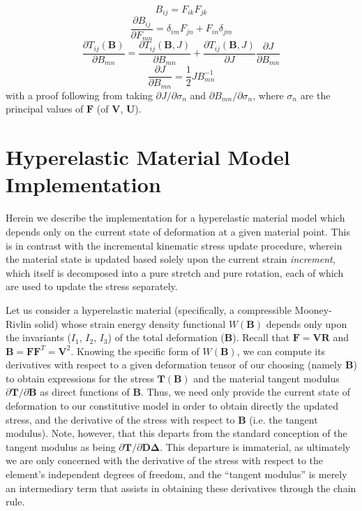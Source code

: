 \documentclass[11pt]{article} %
\begin{document}
\begin{equation}
	B_{ij} = F_{ik} F_{jk}
\end{equation}
\begin{equation}
	\frac{\partial B_{ij}}{\partial F_{mn}} = \delta_{im} F_{jn} + F_{in} \delta_{jm}
\end{equation}
\begin{equation}
	\frac{\partial T_{ij} (\mathbf{B})}{\partial B_{mn}} = \frac{\partial T_{ij} (\mathbf{B}, J)}{\partial B_{mn}} + \frac{\partial T_{ij} (\mathbf{B}, J)}{\partial J} \frac{\partial J}{\partial B_{mn}}
\end{equation}
\begin{equation}
	\frac{\partial J}{\partial B_{mn}} = \frac{1}{2} J B_{mn}^{-1}
\end{equation}
with a proof following from taking $\partial J / \partial \sigma_n$ and $\partial B_{mn} / \partial \sigma_n$, where $\sigma_n$ are the principal values of $\mathbf{F}$ (of $\mathbf{V}$, $\mathbf{U}$).

\section{Hyperelastic Material Model Implementation}

Herein we describe the implementation for a hyperelastic material model which depends only on the current state of deformation at a given material point. This is in contrast with the incremental kinematic stress update procedure, wherein the material state is updated based solely upon the current strain \textit{increment}, which itself is decomposed into a pure stretch and pure rotation, each of which are used to update the stress separately.

Let us consider a hyperelastic material (specifically, a compressible Mooney-Rivlin solid) whose strain energy density functional $W(\mathbf{B})$ depends only upon the invariants ($I_1$, $I_2$, $I_3$) of the total deformation ($\mathbf{B}$). Recall that $\mathbf{F} = \mathbf{V} \mathbf{R}$ and $\mathbf{B} = \mathbf{F} \mathbf{F}^T = \mathbf{V}^2$. Knowing the specific form of $W(\mathbf{B})$, we can compute its derivatives with respect to a given deformation tensor of our choosing (namely $\mathbf{B}$) to obtain expressions for the stress $\mathbf{T} (\mathbf{B})$ and the material tangent modulus $\partial \mathbf{T} / \partial \mathbf{B}$ as direct functions of $\mathbf{B}$. Thus, we need only provide the current state of deformation to our constitutive model in order to obtain directly the updated stress, and the derivative of the stress with respect to $\mathbf{B}$ (i.e. the tangent modulus). Note, however, that this departs from the standard conception of the tangent modulus as being $\partial \mathbf{T} / \partial \mathbf{D \Delta}$. This departure is immaterial, as ultimately we are only concerned with the derivative of the stress with respect to the element's independent degrees of freedom, and the ``tangent modulus'' is merely an intermediary term that assists in obtaining these derivatives through the chain rule.
\end{document}
